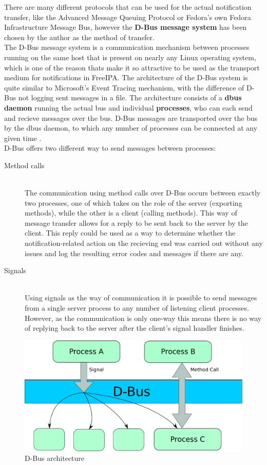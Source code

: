 There are many different protocols that can be used for the actual notification transfer, like the Advanced Message Queuing Protocol or Fedora's own Fedora Infrastructure Message Bus,
however the \textbf{D-Bus message system} has been chosen by the author as the method of transfer.\\
The D-Bus message system is a communication mechanism between processes running on the same host that is present on nearly any Linux operating system,
which is one of the reason thats make it so attractive to be used as the transport medium for notifications in FreeIPA.
The architecture of the D-Bus system is quite similar to Microsoft's Event Tracing mechanism, with the difference of D-Bus not logging sent messages in a file.
The architecture consists of a \textbf{dbus daemon} running the actual bus and individual \textbf{processes}, who can each send and recieve messages over the bus.
D-Bus messages are transported over the bus by the dbus daemon, to which any number of processes can be connected at any given time \cite{dbusWeb}. \\
D-Bus offers two different way to send messages between processes:
\begin{description}
    \item[Method calls]\hfill \\
        The communication using method calls over D-Bus occurs between exactly two processes, one of which takes on the role of the server (exporting methods), while the other is a client (calling methods).
        This way of message transfer allows for a reply to be sent back to the server by the client. This reply could be used as a way to determine whether the notification-related action on the recieving end
        was carried out without any issues and log the resulting error codes and messages if there are any.
    \item[Signals]\hfill \\
        Using signals as the way of communication it is possible to send messages from a single server process to any number of listening client processes. However, as the communication is only one-way
        this means there is no way of replying back to the server after the client's signal handler finishes.
\end{description}
\begin{figure}[!ht]
    \centering
        \includegraphics[scale=0.6]{fig/dbus}
    \caption{D-Bus architecture}
    \label{fig:dbus}
\end{figure}

